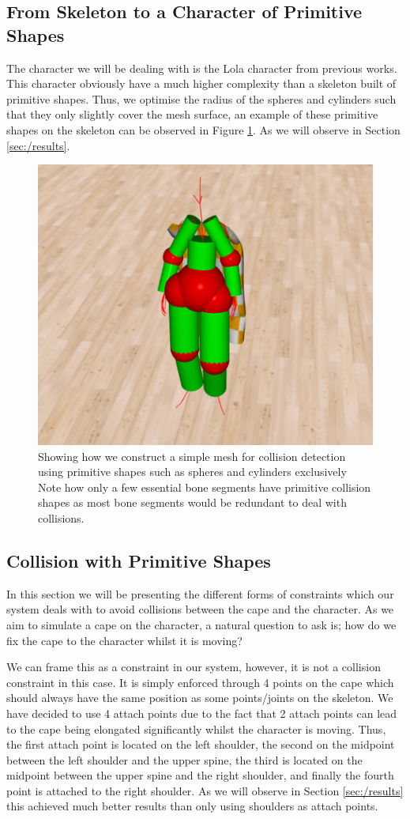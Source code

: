 \documentclass{article}
\begin{document}
\subsection{From Skeleton to a Character of Primitive Shapes}

The character we will be dealing with is the Lola character from previous works. This character obviously
have a much higher complexity than a skeleton built of primitive shapes. Thus, we optimise the radius of
the spheres and cylinders such that they only slightly cover the mesh surface, an example of these primitive
shapes on the skeleton can be observed in Figure \ref{fig:methodology/skeleton}. As we will observe in Section
\ref{sec:/results}. 

\begin{figure}[!ht]
  \centering
  \includegraphics[width=.4\linewidth]{figs/skeleton.png}
  \caption{Showing how we construct a simple mesh for collision detection using primitive shapes such as spheres
  and cylinders exclusively Note how only a few essential bone segments have primitive collision shapes as most
  bone segments would be redundant to deal with collisions.}
  \label{fig:methodology/skeleton}
\end{figure}

\subsection{Collision with Primitive Shapes}

In this section we will be presenting the different forms of constraints which our system deals with to
avoid collisions between the cape and the character. As we aim to simulate a cape on the character, a natural
question to ask is; how do we fix the cape to the character whilst it is moving? 

We can frame this as a constraint in our system, however, it is not a collision constraint in this case.
It is simply enforced through 4 points on the cape which should always have the same position as some points/joints on
the skeleton. We have decided to use 4 attach points due to the fact that 2 attach points can lead to the
cape being elongated significantly whilst the character is moving. Thus, the first attach point is located on
the left shoulder, the second on the midpoint between the left shoulder and the upper spine, the third is located 
on the midpoint between the upper spine and the right shoulder, and finally the fourth point is attached to the
right shoulder. As we will observe in Section \ref{sec:/results} this achieved much better results than only using
shoulders as attach points.
\end{document}
